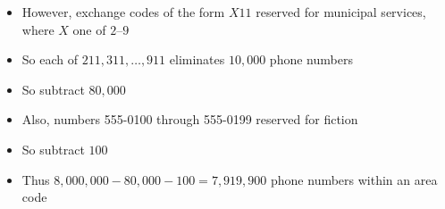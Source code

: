 \documentclass[handout]{beamer}
\theoremstyle{definition}
\begin{document}
\begin{frame}
\begin{itemize}
\item However, exchange codes of the form $X11$
reserved for municipal services, where $X$ one of $2$--$9$
\item So each of $211,311,\ldots,911$ eliminates $10,000$ phone numbers
\item So subtract $80,000$
\item Also, numbers 555-0100 through 555-0199 reserved for fiction
\item So subtract $100$
\item Thus $8,000,000-80,000-100=7,919,900$ phone numbers within an area code
\end{itemize}
\end{frame}
\end{document}

